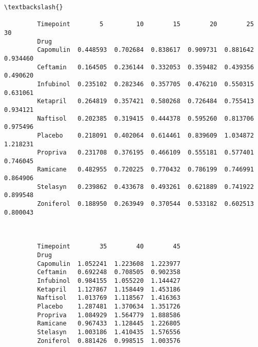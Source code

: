 \documentclass[11pt]{article}
\begin{document}
\begin{Verbatim}[commandchars=\\\{\}]
                                                                                \textbackslash{}
                                                                                 
         Timepoint        5         10        15        20        25        30   
         Drug                                                                    
         Capomulin  0.448593  0.702684  0.838617  0.909731  0.881642  0.934460   
         Ceftamin   0.164505  0.236144  0.332053  0.359482  0.439356  0.490620   
         Infubinol  0.235102  0.282346  0.357705  0.476210  0.550315  0.631061   
         Ketapril   0.264819  0.357421  0.580268  0.726484  0.755413  0.934121   
         Naftisol   0.202385  0.319415  0.444378  0.595260  0.813706  0.975496   
         Placebo    0.218091  0.402064  0.614461  0.839609  1.034872  1.218231   
         Propriva   0.231708  0.376195  0.466109  0.555181  0.577401  0.746045   
         Ramicane   0.482955  0.720225  0.770432  0.786199  0.746991  0.864906   
         Stelasyn   0.239862  0.433678  0.493261  0.621889  0.741922  0.899548   
         Zoniferol  0.188950  0.263949  0.370544  0.533182  0.602513  0.800043   
         
                                                  
                                                  
         Timepoint        35        40        45  
         Drug                                     
         Capomulin  1.052241  1.223608  1.223977  
         Ceftamin   0.692248  0.708505  0.902358  
         Infubinol  0.984155  1.055220  1.144427  
         Ketapril   1.127867  1.158449  1.453186  
         Naftisol   1.013769  1.118567  1.416363  
         Placebo    1.287481  1.370634  1.351726  
         Propriva   1.084929  1.564779  1.888586  
         Ramicane   0.967433  1.128445  1.226805  
         Stelasyn   1.003186  1.410435  1.576556  
         Zoniferol  0.881426  0.998515  1.003576  
\end{Verbatim}
            
\end{document}
